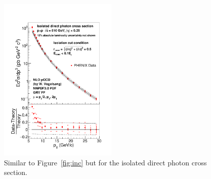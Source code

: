 \documentclass[twocolumn,letterpaper,aps,prl,longbibliography,superscriptaddress,floatfix]{revtex4-2}
\begin{document}
\begin{figure} 
\centering
\includegraphics[width=0.5\textwidth]{CrossSection-isophoton-werner}
\caption{Similar to Figure~\ref{fig:inc} but for the isolated direct photon cross section.}
\label{fig:iso}
\end{figure}

%
\end{document}

